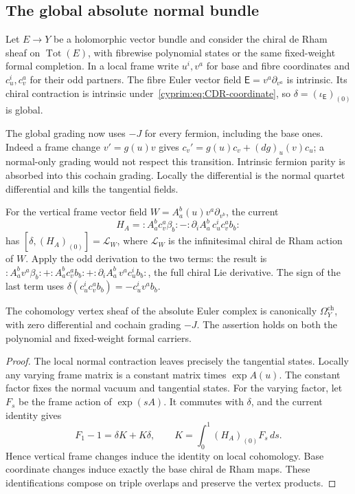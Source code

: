 \subsection{The global absolute normal bundle}

Let $E\to Y$ be a holomorphic vector bundle and consider the
chiral de Rham sheaf on $\operatorname{Tot}(E)$,
with fibrewise polynomial states or the same
fixed-weight formal completion. In a local frame write
$u^i,v^a$ for base and fibre coordinates and $c_u^i,c_v^a$
for their odd partners. The fibre Euler
vector field $\mathsf E=v^a\partial_{v^a}$ is
intrinsic. Its chiral contraction is intrinsic
under~\eqref{cyprim:eq:CDR-coordinate}, so
$\delta=(\iota_{\mathsf E})_{(0)}$ is global.

The global grading now uses $-J$ for every
fermion, including the base ones. Indeed a frame
change $v'=g(u)v$ gives
$c_v'=g(u)c_v+(dg)_u(v)c_u$; a normal-only grading
would not respect this transition. Intrinsic
fermion parity is absorbed into this cochain
grading. Locally the differential is the normal
quartet differential and kills the tangential
fields.

For the vertical frame vector field
$W=A^b_a(u)v^a\partial_{v^b}$, the current
\[
 H_A=:A^b_ac_v^a\beta_b:
       -:\partial_iA^b_a\,c_u^ic_v^ab_b:
\]
has $[\delta,(H_A)_{(0)}]=\mathcal L_W$, where
$\mathcal L_W$ is the infinitesimal chiral de Rham action of $W$.
Apply the odd derivation to the two terms: the
result is
$:A^b_av^a\beta_b:+:A^b_ac_v^ab_b:
+:\partial_iA^b_a\,v^ac_u^ib_b:$,
the full chiral Lie derivative. The sign of the
last term uses $\delta(c_u^ic_v^ab_b)=-c_u^iv^ab_b$.

\begin{theorem}\label{cyprim:thm:absolute-normal}
The cohomology vertex sheaf of the absolute
Euler complex is canonically
$\Omega_Y^{\mathrm{ch}}$, with zero differential
and cochain grading $-J$. The assertion holds
on both the polynomial and fixed-weight formal
carriers.
\end{theorem}

\begin{proof}
The local normal contraction leaves precisely
the tangential states. Locally any varying
frame matrix is a constant matrix times
$\exp A(u)$. The constant factor fixes the
normal vacuum and tangential states. For the
varying factor, let $F_s$ be the frame action
of $\exp(sA)$. It commutes with $\delta$, and
the current identity gives
\[
 F_1-1=\delta K+K\delta,
 \qquad K=\int_0^1(H_A)_{(0)}F_s\,ds.
\]
Hence vertical frame changes induce the identity
on local cohomology. Base coordinate changes
induce exactly the base chiral de Rham maps.
These identifications compose on triple overlaps
and preserve the vertex products.
\end{proof}

